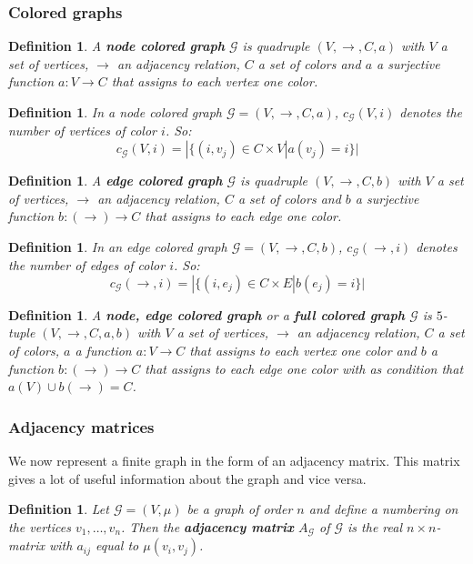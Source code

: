 \documentclass[a4paper,11pt]{report}
\newtheorem{definition}[theorem]{Definition}
\newcommand{\graf}{\mathscr{G}}
\begin{document}
 \subsubsection{Colored graphs}\label{colored}
 \begin{definition}\label{defcolor}
   A \textbf{node colored graph} $\graf$ is quadruple  $(V, \to, C, a)$ with $V$ 
   a set of vertices, $\to$ an adjacency relation, $C$ a set of colors and $a$ 
   a surjective function $a: V \to C$ that assigns to each vertex one color.
 \end{definition}
 \begin{definition}
   In a node colored graph $\graf = (V, \to, C, a) $, $c_\graf(V,i)$ denotes the number of vertices of 
   color $i$. So:
   $$c_\graf(V, i) = |\{(i, v_j) \in C \times V | a(v_j) = i\}|$$
 \end{definition}
 \begin{definition}\label{edgecolored}
   A \textbf{edge colored graph} $\graf$ is quadruple  $(V, \to, C, b)$ with $V$ 
   a set of vertices, $\to$ an adjacency relation, $C$ a set of colors and $b$ 
   a surjective function $b: (\to) \to C$ that assigns to each edge one color.
 \end{definition}
 \begin{definition}
   In an edge colored graph $\graf = (V, \to, C, b) $, $c_\graf(\to,i)$ denotes the number of edges of 
   color $i$. So:
   $$c_\graf(\to, i) = |\{(i, e_j) \in C \times E | b(e_j) = i\}|$$
 \end{definition}
  \begin{definition}\label{fullcolored}
   A \textbf{node, edge colored graph} or a \textbf{full colored graph} $\graf$ is $5$-tuple  $(V, \to, C, a, b)$ with $V$ 
   a set of vertices, $\to$ an adjacency relation, $C$ a set of colors,  $a$ 
   a function $a: V \to C$ that assigns to each vertex one color and $b$ 
   a function $b: (\to) \to C$ that assigns to each edge one color with as 
   condition that $a(V) \cup b(\to) = C$.
 \end{definition}

 \subsubsection{Adjacency matrices}
 We now represent a finite graph in the form of an adjacency matrix. This 
 matrix gives a lot of useful information about the graph and vice versa.
 
 
 \begin{definition}
 Let $\graf=(V, \mu)$ be a graph of order $n$ and define a numbering on the 
 vertices $v_1,\ldots, v_n$. Then the \textbf{adjacency matrix} $A_\graf$ of $\graf$ is the real
 $n\times n$-matrix with $a_{ij}$ equal to $\mu(v_i, v_j)$.
 \end{definition}
 
\end{document}
